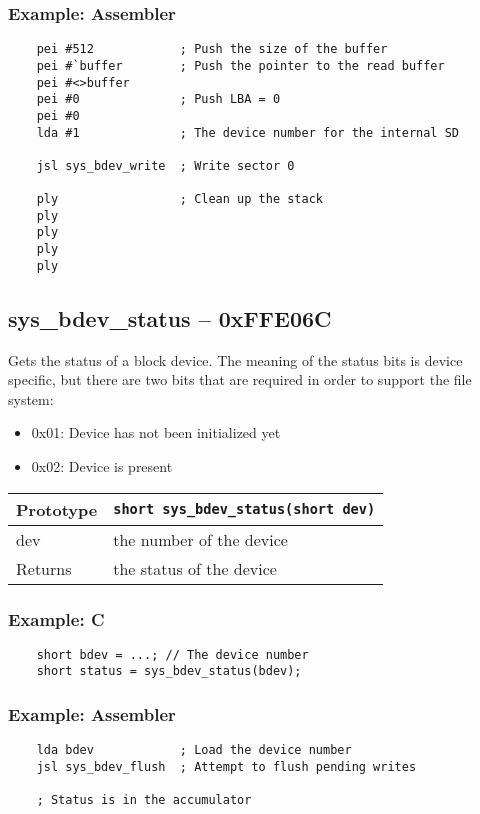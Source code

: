 \subsubsection*{Example: Assembler}
\begin{verbatim}
    pei #512			; Push the size of the buffer
    pei #`buffer		; Push the pointer to the read buffer
    pei #<>buffer
    pei #0				; Push LBA = 0
    pei #0
    lda #1				; The device number for the internal SD

    jsl sys_bdev_write	; Write sector 0

    ply					; Clean up the stack
    ply
    ply
    ply
    ply
\end{verbatim}

\subsection*{sys\_bdev\_status -- 0xFFE06C}
Gets the status of a block device. The meaning of the status bits is device specific, but there are two bits that are required in order to support the file system:
\begin{itemize}
    \item 0x01: Device has not been initialized yet
    \item 0x02: Device is present
\end{itemize}

\bigskip

\begin{tabular}{|l||l|} \hline
Prototype & \lstinline!short sys_bdev_status(short dev)! \\ \hline
dev & the number of the device \\ \hline
Returns & the status of the device \\ \hline
\end{tabular}

\subsubsection*{Example: C}
\begin{lstlisting}
    short bdev = ...; // The device number
    short status = sys_bdev_status(bdev);
\end{lstlisting}

\subsubsection*{Example: Assembler}
\begin{verbatim}
    lda bdev            ; Load the device number
    jsl sys_bdev_flush  ; Attempt to flush pending writes

    ; Status is in the accumulator
\end{verbatim}


